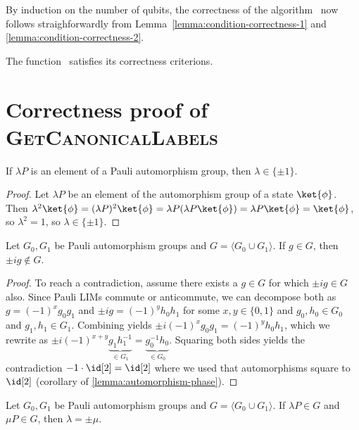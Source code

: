 By induction on the number of qubits, the correctness of the algorithm \getsingleisomorphism~now follows straighforwardly from Lemma~\ref{lemma:condition-correctness-1} and \ref{lemma:condition-correctness-2}.

\begin{corollary}
    The function \getsingleisomorphism~satisfies its correctness criterions.
\end{corollary}



\section{Correctness proof of \textsc{GetCanonicalLabels}}
\label{sec:proof-getcanonicallabels}



\begin{lemma}
    \label{lemma:automorphism-phase}
    If $\lambda P$ is an element of a Pauli automorphism group, then $\lambda \in \{\pm 1\}$.
\end{lemma}
\begin{proof}
    Let $\lambda P$ be an element of the automorphism group of a state $\ket{\phi}$.
    Then $\lambda^2 \ket{\phi} = (\lambda P)^2 \ket{\phi} = \lambda P (\lambda P \ket{\phi}) = \lambda P \ket{\phi} = \ket{\phi}$, so $\lambda^2 = 1$, so $\lambda \in \{\pm 1\}$.
\end{proof}

\begin{lemma}
    Let $G_0, G_1$ be Pauli automorphism groups and $G = \langle G_0 \cup G_1 \rangle$.
    If $g\in G$, then $\pm i g \notin G$.
\end{lemma}
\begin{proof}
    To reach a contradiction, assume there exists a $g\in G$ for which $\pm i g \in G$ also.
    Since Pauli LIMs commute or anticommute, we can decompose both as $g = (-1)^x g_0 g_1$ and $\pm i g = (-1)^y h_0 h_1$ for some $x, y \in \{0, 1\}$ and $g_0, h_0\in G_0$ and $g_1, h_1 \in G_1$.
    Combining yields $\pm i (-1)^x g_0 g_1 = (-1)^y h_0 h_1$, which we rewrite as $\pm i (-1)^{x+y} \underbrace{g_1 h_1^{-1}}_{\in G_1} = \underbrace{g_0^{-1} h_0}_{\in G_0}$. 
    Squaring both sides yields the contradiction $-1 \cdot \id[2] = \id[2]$ where we used that automorphisms square to $\id[2]$ (corollary of \autoref{lemma:automorphism-phase}).
\end{proof}

\begin{corollary}
    Let $G_0, G_1$ be Pauli automorphism groups and $G = \langle G_0 \cup G_1 \rangle$.
    If $\lambda P \in G$ and $\mu P \in G$, then $\lambda = \pm \mu$.
\end{corollary}
